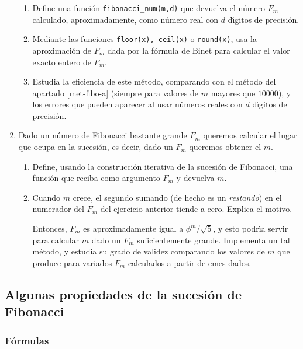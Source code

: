 \begin{ejer}
\begin{enumerate}
\begin{enumerate}
\item Define una función \lstinline|fibonacci_num(m,d)| que devuelva el n\'umero
$F_m$
calculado, aproximadamente,  como n\'umero real con $d$ d\'{\i}gitos de
precisi\'on.

\item Mediante las funciones \lstinline|floor(x), ceil(x)| o
\lstinline|round(x)|, usa la aproximaci\'on de $F_m$ dada por la f\'ormula de
Binet 
para calcular el valor exacto entero de $F_m$.

\item Estudia la eficiencia de este m\'etodo, comparando con el m\'etodo del
apartado
\ref{met-fibo-a} (siempre para valores de $m$ mayores que $10000$), y los
errores que pueden
aparecer al usar n\'umeros reales con $d$ d\'{\i}gitos de precisión. 
\end{enumerate}

\item Dado un n\'umero de Fibonacci bastante grande $F_m$ queremos calcular el
lugar que ocupa en la sucesi\'on, es decir, dado un $F_m$ queremos obtener el
$m$.
\begin{enumerate}
\item Define, usando la construcci\'on iterativa de la sucesi\'on de Fibonacci, 
una funci\'on que reciba como argumento  $F_m$ y devuelva $m$.
    
\item \label{fib-log} Cuando $m$ crece, el segundo sumando (de hecho es un
{\itshape restando})
en el numerador del $F_m$ del ejercicio anterior tiende a cero. Explica el
motivo. 

Entonces, $F_m$ es aproximadamente igual a $\phi^m/ \sqrt{5}$,  y esto
podr\'{\i}a servir para calcular $m$ dado un $F_m$ suficientemente grande.
Implementa un tal m\'etodo, y estudia su grado de validez comparando los valores
de $m$ que produce para variados $F_m$ calculados a partir de emes dados.
\end{enumerate}
\end{enumerate}
\end{ejer}

\subsection{Algunas propiedades de la sucesi\'on de Fibonacci}


\subsubsection{F\'ormulas}



